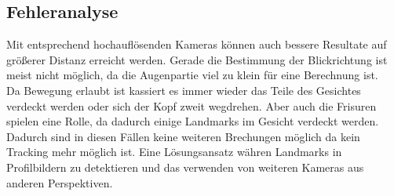 \subsection{Fehleranalyse}
Mit entsprechend hochauflösenden Kameras können auch bessere Resultate auf größerer Distanz erreicht werden. Gerade die Bestimmung der Blickrichtung ist meist nicht möglich, da die Augenpartie viel zu klein für eine Berechnung ist.\\
Da Bewegung erlaubt ist kassiert es immer wieder das Teile des Gesichtes verdeckt werden oder sich der Kopf zweit wegdrehen. Aber auch die Frisuren spielen eine Rolle, da dadurch einige Landmarks im Gesicht verdeckt werden. Dadurch sind in diesen Fällen keine weiteren Brechungen möglich da kein Tracking mehr möglich ist. Eine Lösungsansatz währen Landmarks in Profilbildern zu detektieren und das verwenden von weiteren Kameras aus anderen Perspektiven.\\
